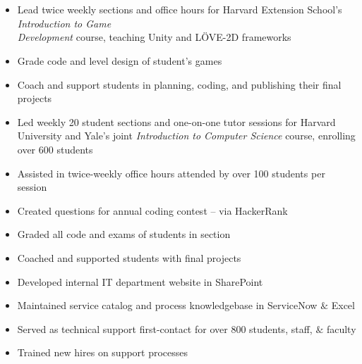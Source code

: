 \documentclass[hidelinks, 10pt]{article}
\begin{document}
\section*{}
\begin{addmargin}{.5in}

    \begin{itemize}\setlength\itemsep{-4pt}
      \item{Lead twice weekly sections and office hours for Harvard Extension School's \emph{Introduction to Game\\ Development} course, teaching Unity and LÖVE-2D frameworks}
      \item{Grade code and level design of student's games}
      \item{Coach and support students in planning, coding, and publishing their final projects}
    \end{itemize}

    \begin{itemize}\setlength\itemsep{-4pt}
      \item{Led weekly 20 student sections and one-on-one tutor sessions for Harvard University and Yale's joint \emph{Introduction to Computer Science} course, enrolling over 600 students}
      \item{Assisted in twice-weekly office hours attended by over 100 students per session}
      \item{Created questions for annual coding contest – via HackerRank}
      \item{Graded all code and exams of students in section}
      \item{Coached and supported students with final projects}
    \end{itemize}

    \begin{itemize}\setlength\itemsep{-4pt}
        \item{Developed internal IT department website in SharePoint}
          \item{Maintained service catalog and process knowledgebase in ServiceNow $\&$ Excel}
          \item{Served as technical support first-contact for over 800 students, staff, $\&$ faculty}
          \item{Trained new hires on support processes}
      \end{itemize}
\end{addmargin}

\end{document}
